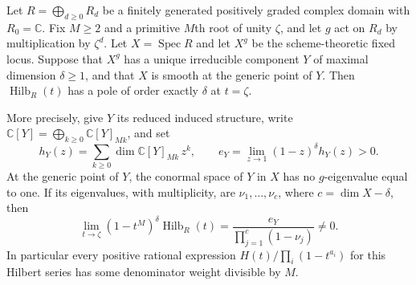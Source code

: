 \begin{proposition}
\label{prop:fixedcomponentpole}
Let $R=\bigoplus_{d\ge0}R_d$ be a finitely generated positively
graded complex domain with $R_0=\mathbb C$. Fix $M\ge2$ and a
primitive $M$th root of unity $\zeta$, and let $g$ act on $R_d$
by multiplication by $\zeta^d$. Let $X=\operatorname{Spec}R$ and
let $X^g$ be the scheme-theoretic fixed locus. Suppose that
$X^g$ has a unique irreducible component $Y$ of maximal dimension
$\delta\ge1$, and that $X$ is smooth at the generic point of $Y$.
Then $\operatorname{Hilb}_R(t)$ has a pole of order exactly
$\delta$ at $t=\zeta$.

More precisely, give $Y$ its reduced induced structure, write
$\mathbb C[Y]=\bigoplus_{k\ge0}\mathbb C[Y]_{Mk}$, and set
\[
 h_Y(z)=\sum_{k\ge0}\dim\mathbb C[Y]_{Mk}\,z^k,
 \qquad
 e_Y=\lim_{z\to1}(1-z)^\delta h_Y(z)>0.
\]
At the generic point of $Y$, the conormal space of $Y$ in $X$
has no $g$-eigenvalue equal to one. If its eigenvalues, with
multiplicity, are $\nu_1,\ldots,\nu_c$, where
$c=\dim X-\delta$, then
\[
 \lim_{t\to\zeta}(1-t^M)^\delta\operatorname{Hilb}_R(t)
       =\frac{e_Y}{\prod_{j=1}^c(1-\nu_j)}\ne0.
 \tag{P-F23a}
\]
In particular every positive rational expression
$H(t)/\prod_i(1-t^{a_i})$ for this Hilbert series has some
denominator weight divisible by $M$.
\end{proposition}

